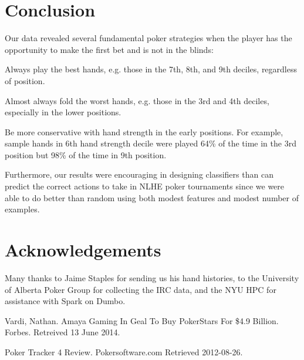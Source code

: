 \documentclass[twoside]{article}
\begin{document}
\begin{multicols}{2}

\section{Conclusion}

Our data revealed several fundamental poker strategies when the player has the opportunity to make the first bet and is not in the blinds:
\begin{compactitem}
\item{} Always play the best hands, e.g. those in the 7th, 8th, and 9th deciles, regardless of position. 
\item{} Almost always fold the worst hands, e.g. those in the 3rd and 4th deciles, especially in the lower positions.
\item{}Be more conservative with hand strength in the early positions. For example, sample hands in 6th hand strength decile were played 64\% of the time in the 3rd position but 98\% of the time in 9th position.

Furthermore, our results were encouraging in designing classifiers than can predict the correct actions to take in NLHE poker tournaments since we were able to do better than random using both modest features and modest number of examples.
\end{compactitem}



\section{Acknowledgements}

Many thanks to Jaime Staples for sending us his hand histories, to the University of Alberta Poker Group for collecting the IRC data, and the NYU HPC for assistance with Spark on Dumbo. 



\begin{thebibliography}{99} %

 Vardi, Nathan. Amaya Gaming In Geal To Buy PokerStars For \$4.9 Billion. Forbes. Retreived 13 June 2014. 

 Poker Tracker 4 Review. Pokersoftware.com Retrieved 2012-08-26.


\end{thebibliography}
\end{multicols}
\end{document}
